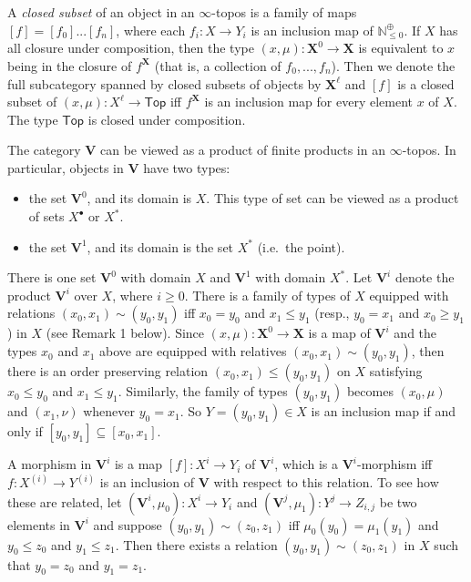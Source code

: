 \documentclass[a4paper,reqno,oneside]{article}
\begin{document}
A \textit{closed subset} of an object in an $\infty$-topos is a family of maps $[f]=[f_0]...[f_n]$, where each $f_i:X\to Y_i$ is an inclusion map of $\mathbb{N}_{\leq0}^\oplus$. If $X$ has all closure under composition, then the type $(x,\mu):\mathbf{X}^0\to\mathbf{X}$ is equivalent to $x$ being in the closure of $f^{\mathbf{X}}$ (that is, a collection of $f_0,...,f_n$). Then we denote the full subcategory spanned by closed subsets of objects by $\mathbf{X}^\ell$ and $[f]$ is a closed subset of $(x,\mu):X^\ell\to \mathsf{Top}$ iff $f^{\mathbf{X}}$ is an inclusion map for every element $x$ of $X$. The type $\mathsf{Top}$ is closed under composition.

The category $\mathbf{V}$ can be viewed as a product of finite products in an $\infty$-topos. In particular, objects in $\mathbf{V}$ have two types: 
\begin{itemize}
    \item the set $\mathbf{V}^0$, and its domain is $X$. This type of set can be viewed as a product of sets $X^{\bullet}$ or $X^{\ast}$.
    \item the set $\mathbf{V}^1$, and its domain is the set $X^{\ast}$ (i.e.\ the point).
\end{itemize}
There is one set $\mathbf{V}^0$ with domain $X$ and $\mathbf{V}^1$ with domain $X^{\ast}$. Let $\mathbf{V}^i$ denote the product $\mathbf{V}^i$ over $X$, where $i\geq 0$. There is a family of types of $X$ equipped with relations $(x_0,x_1)\sim (y_0,y_1)$ iff $x_0=y_0$ and $x_1\leq y_1$ (resp., $y_0=x_1$ and $x_0\geq y_1$) in $X$ (see Remark 1 below). Since $(x,\mu):\mathbf{X}^0\to\mathbf{X}$ is a map of $\mathbf{V}^i$ and the types $x_0$ and $x_1$ above are equipped with relatives $(x_0,x_1)\sim (y_0,y_1)$, then there is an order preserving relation $(x_0,x_1)\leq (y_0,y_1)$ on $X$ satisfying $x_0\leq y_0$ and $x_1\leq y_1$. Similarly, the family of types $(y_0,y_1)$ becomes $(x_0,\mu)$ and $(x_1,\nu)$ whenever $y_0=x_1$. So $Y=(y_0,y_1)\in X$ is an inclusion map if and only if $[y_0,y_1]\subseteq [x_0,x_1]$.

A morphism in $\mathbf{V}^i$ is a map $[f]:X^{i}\to Y_i$ of $\mathbf{V}^i$, which is a $\mathbf{V}^i$-morphism iff $f:X^{(i)}\to Y^{(i)}$ is an inclusion of $\mathbf{V}$ with respect to this relation. To see how these are related, let $(\mathbf{V}^i,\mu_0):X^{i}\to Y_i$ and $(\mathbf{V}^j,\mu_1):Y^{j}\to Z_{i,j}$ be two elements in $\mathbf{V}^i$ and suppose $(y_0,y_1)\sim (z_0,z_1)$ iff $\mu_0(y_0)=\mu_1(y_1)$ and $y_0\leq z_0$ and $y_1\leq z_1$. Then there exists a relation $(y_0,y_1)\sim (z_0,z_1)$ in $X$ such that $y_0=z_0$ and $y_1=z_1$.
\end{document}
